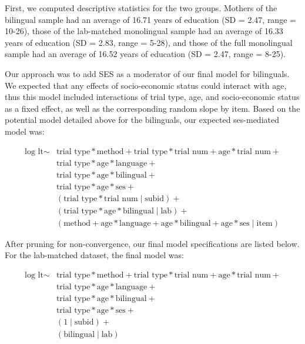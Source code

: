 \documentclass[
  english,
  ,man,floatsintext]{apa6}
\begin{document}
First, we computed descriptive statistics for the two groups. Mothers of the bilingual sample had an average of 16.71 years of education (SD = 2.47, range = 10-26), those of the lab-matched monolingual sample had an average of 16.33 years of education (SD = 2.83, range = 5-28), and those of the full monolingual sample had an average of 16.52 years of education (SD = 2.47, range = 8-25).

Our approach was to add SES as a moderator of our final model for bilinguals. We expected that any effects of socio-economic status could interact with age, thus this model included interactions of trial type, age, and socio-economic status as a fixed effect, as well as the corresponding random slope by item. Based on the potential model detailed above for the bilinguals, our expected ses-mediated model was:

\begin{equation}
\begin{split}
\text{log lt} \sim & \text{trial type} * \text{method} + \text{trial type} * \text{trial num} + \text{age} * \text{trial num} + \\
& \text{trial type} * \text{age} * \text{language} + \\
& \text{trial type} * \text{age} * \text{bilingual} + \\
& \text{trial type} * \text{age} * \text{ses} + \\
& (\text{trial type} * \text{trial num} \mid \text{subid}) + \\
& (\text{trial type} * \text{age} * \text{bilingual} \mid \text{lab}) + \\
& (\text{method} + \text{age} * \text{language} + \text{age} * \text{bilingual} +
\text{age} * \text{ses} \mid \text{item})
\end{split}
\end{equation}

After pruning for non-convergence, our final model specifications are listed below. For the lab-matched dataset, the final model was:

\begin{equation}
\begin{split}
\text{log lt} \sim & \text{trial type} * \text{method} + \text{trial type} * \text{trial num} + \text{age} * \text{trial num} + \\
& \text{trial type} * \text{age} * \text{language} + \\
& \text{trial type} * \text{age} * \text{bilingual} + \\
& \text{trial type} * \text{age} * \text{ses} + \\
& (1 \mid \text{subid}) + \\
& (\text{bilingual} \mid \text{lab}) 
\end{split}
\end{equation}
\end{document}
